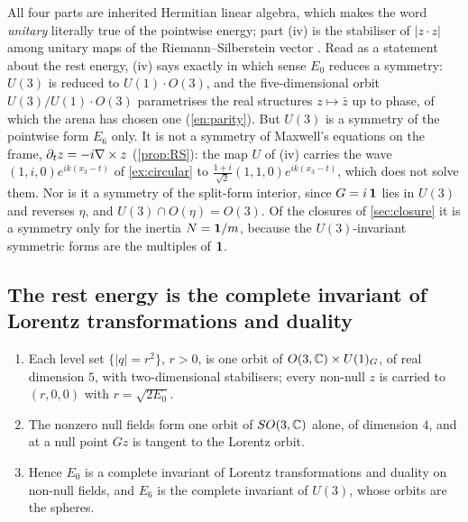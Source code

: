 All four parts are inherited Hermitian linear algebra, which makes the word \emph{unitary} literally true of the pointwise energy; part (iv) is
the stabiliser of $|z\cdot z|$ among unitary maps of the Riemann--Silberstein vector \cite{Silberstein1907,BialynickiBirula13}. Read as a
statement about the rest energy, (iv) says exactly in which sense $E_0$ reduces a symmetry: $U(3)$ is reduced to $U(1)\cdot O(3)$, and the
five-dimensional orbit $U(3)/U(1)\cdot O(3)$ parametrises the real structures $z\mapsto\bar z$ up to phase, of which the arena has chosen one
(\cref{en:parity}). But $U(3)$ is a symmetry of the pointwise form $E_6$ only. It is not a symmetry of Maxwell's equations on the frame,
$\partial_tz=-i\nabla\times z$ (\cref{prop:RS}): the map $U$ of (iv) carries the wave $(1,i,0)e^{ik(x_3-t)}$ of \cref{ex:circular} to
$\tfrac{1+i}{\sqrt2}(1,1,0)e^{ik(x_3-t)}$, which does not solve them. Nor is it a symmetry of the split-form interior, since $G=i\,\mathbf 1$ lies in
$U(3)$ and reverses $\eta$, and $U(3)\cap O(\eta)=O(3)$. Of the closures of \cref{sec:closure} it is a symmetry only for the inertia $N=\mathbf 1/m$,
because the $U(3)$-invariant symmetric forms are the multiples of $\mathbf 1$.

\subsection{The rest energy is the complete invariant of Lorentz transformations and duality}
\label{sec:energy-orbits}

\begin{theorem}[Orbits]
\label{en:orbits}
\begin{enumerate}[label=(\roman*),leftmargin=2.2em]
\item Each level set $\{|q|=r^2\}$, $r>0$, is one orbit of $O(3,\mathbb{C})\times U(1)_G$, of real dimension $5$, with two-dimensional stabilisers; every
non-null $z$ is carried to $(r,0,0)$ with $r=\sqrt{2E_0}$.
\item The nonzero null fields form one orbit of $SO(3,\mathbb{C})$ alone, of dimension $4$, and at a null point $Gz$ is tangent to the Lorentz orbit.
\item Hence $E_0$ is a complete invariant of Lorentz transformations and duality on non-null fields, and $E_6$ is the complete invariant of
$U(3)$, whose orbits are the spheres.
\end{enumerate}
\end{theorem}

